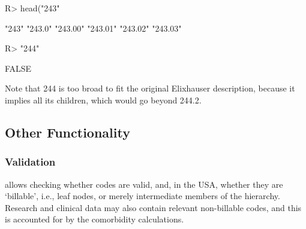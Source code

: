 \documentclass[article]{jss}
\begin{document}
\begin{CodeChunk}

\begin{CodeInput}
R> head("243" %
\end{CodeInput}

\begin{CodeOutput}
[1] "243"    "243.0"  "243.00" "243.01" "243.02" "243.03"
\end{CodeOutput}

\begin{CodeInput}
R> "244" %
\end{CodeInput}

\begin{CodeOutput}
[1] FALSE
\end{CodeOutput}
\end{CodeChunk}

Note that 244 is too broad to fit the original Elixhauser description,
because it implies all its children, which would go beyond 244.2.

\hypertarget{other-functionality}{%
\subsection{Other Functionality}\label{other-functionality}}

\hypertarget{validation}{%
\subsubsection{Validation}\label{validation}}

 allows checking whether codes are valid, and, in the USA,
whether they are `billable', i.e., leaf nodes, or merely intermediate
members of the hierarchy. Research and clinical data may also contain
relevant non-billable codes, and this is accounted for by the
comorbidity calculations.
\end{document}
